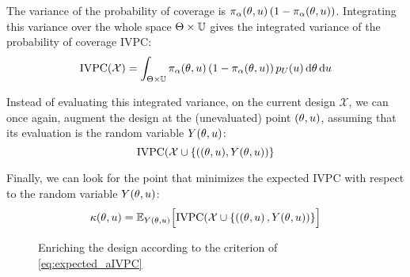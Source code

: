 \documentclass[../../Main_ManuscritThese.tex]{subfiles}
\newcommand\imgpath{/home/victor/acadwriting/Manuscrit/Text/Chapter4/img/}
\begin{document}
The variance of the probability of coverage is $\pi_\alpha(\theta, u) \left(1 - \pi_{\alpha}(\theta,u)\right)$.
Integrating this variance over the whole space $\Theta \times \mathbb{U}$ gives the integrated variance of the probability of coverage $\mathrm{IVPC}$:
\cite{bect_sequential_2012}
\begin{equation}
  \label{eq:IVPC_def}
\mathrm{IVPC}(\mathcal{X}) =  \int_{\Theta \times \mathbb{U}} \pi_{\alpha}(\theta, u) \left(1 - \pi_{\alpha}(\theta, u)\right)p_{U}(u)\,\mathrm{d}\theta \,\mathrm{d}u
\end{equation}

Instead of evaluating this integrated variance, on the current design $\mathcal{X}$, we can once again, augment the design at the (unevaluated) point $(\theta, u)$, assuming that its evaluation is the random variable $Y(\theta, u)$:
\begin{equation}
  \mathrm{IVPC}(\mathcal{X} \cup \{((\theta, u), Y(\theta, u))\}
\end{equation}

Finally, we can look for the point that minimizes the expected $\mathrm{IVPC}$ with respect to the random variable $Y(\theta, u)$:
\begin{equation}
  \label{eq:expected_aIVPC}
  \kappa(\theta, u) = \mathbb{E}_{Y(\theta, u)}\Big[\mathrm{IVPC}(\mathcal{X} \cup \{   \left(\left(\theta, u \right), Y(\theta, u) \right)  \}     \Big]
\end{equation}

\begin{figure}[ht]
  \centering
  
  \caption{\label{fig:IVPC_enrichment} Enriching the design according to the criterion of \cref{eq:expected_aIVPC}}
\end{figure}



\end{document}
